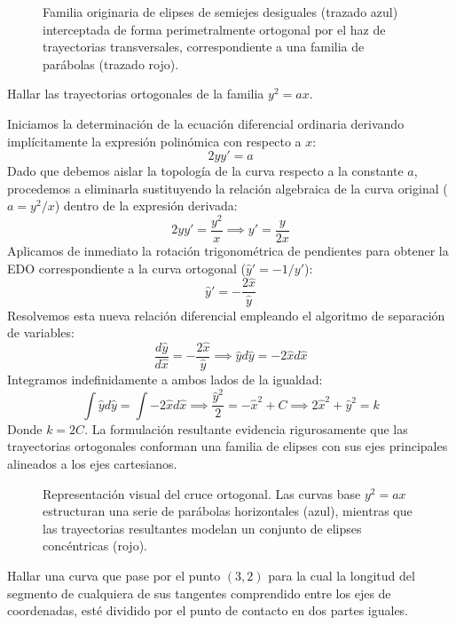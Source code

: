 \begin{tcolorbox}
\begin{figure}[H]
    \centering
    
    \caption{Familia originaria de elipses de semiejes desiguales (trazado azul) interceptada de forma perimetralmente ortogonal por el haz de trayectorias transversales, correspondiente a una familia de parábolas (trazado rojo).}
\end{figure}
\end{tcolorbox}

\begin{ejercicio}
Hallar las trayectorias ortogonales de la familia $y^2 = ax$.
\end{ejercicio}

\begin{tcolorbox}
Iniciamos la determinación de la ecuación diferencial ordinaria derivando implícitamente la expresión polinómica con respecto a $x$:
$$ 2yy' = a $$
Dado que debemos aislar la topología de la curva respecto a la constante $a$, procedemos a eliminarla sustituyendo la relación algebraica de la curva original ($a = y^2/x$) dentro de la expresión derivada:
$$ 2yy' = \frac{y^2}{x} \implies y' = \frac{y}{2x} $$
Aplicamos de inmediato la rotación trigonométrica de pendientes para obtener la EDO correspondiente a la curva ortogonal ($\hat{y}' = -1/y'$):
$$ \hat{y}' = -\frac{2\hat{x}}{\hat{y}} $$
Resolvemos esta nueva relación diferencial empleando el algoritmo de separación de variables:
$$ \frac{d\hat{y}}{d\hat{x}} = -\frac{2\hat{x}}{\hat{y}} \implies \hat{y} d\hat{y} = -2\hat{x} d\hat{x} $$
Integramos indefinidamente a ambos lados de la igualdad:
$$ \int \hat{y} d\hat{y} = \int -2\hat{x} d\hat{x} \implies \frac{\hat{y}^2}{2} = -\hat{x}^2 + C \implies 2\hat{x}^2 + \hat{y}^2 = k $$
Donde $k = 2C$. La formulación resultante evidencia rigurosamente que las trayectorias ortogonales conforman una familia de elipses con sus ejes principales alineados a los ejes cartesianos.

\begin{figure}[H]
    \centering
    
    \caption{Representación visual del cruce ortogonal. Las curvas base $y^2 = ax$ estructuran una serie de parábolas horizontales (azul), mientras que las trayectorias resultantes modelan un conjunto de elipses concéntricas (rojo).}
\end{figure}
\end{tcolorbox}

\begin{ejercicio}
Hallar una curva que pase por el punto $(3, 2)$ para la cual la longitud del segmento de cualquiera de sus tangentes comprendido entre los ejes de coordenadas, esté dividido por el punto de contacto en dos partes iguales.
\end{ejercicio}

